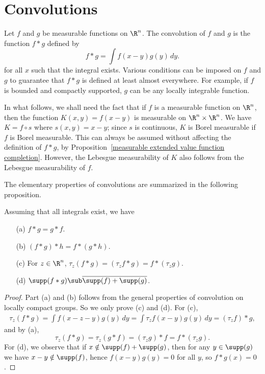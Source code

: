 \section{Convolutions}
Let $f$ and $g$ be measurable functions on $\R^n$. The convolution of $f$ and $g$ is the function $f\ast g$ defined by
\[f\ast g=\int f(x-y)g(y)\,dy.\]
for all $x$ such that the integral exists. Various conditions can be imposed on $f$ and $g$ to guarantee that $f\ast g$ is defined at least almost everywhere. For example, if $f$ is bounded and compactly supported, $g$ can be any locally integrable function.\par
In what follows, we shall need the fact that if $f$ is a measurable function on $\R^n$, then the function $K(x,y)=f(x-y)$ is measurable on $\R^n\times\R^n$. We have $K=f\circ s$ where $s(x,y)=x-y$; since $s$ is continuous, $K$ is Borel measurable if $f$ is Borel measurable. This can always be assumed without affecting the definition of $f\ast g$, by Proposition~\ref{measurable extended value function completion}. However, the Lebesgue measurability of $K$ also follows from the Lebesgue measurability of $f$.\par
The elementary properties of convolutions are summarized in the following proposition.
\begin{proposition}\label{convolution on R^n prop}
Assuming that all integrals exist, we have
\begin{itemize}
\item[(a)] $f\ast g=g\ast f$.
\item[(b)] $(f\ast g)\ast h=f\ast(g\ast h)$.
\item[(c)] For $z\in\R^n$, $\tau_z(f\ast g)=(\tau_zf\ast g)=f\ast(\tau_zg)$.
\item[(d)] $\supp(f\ast g)\sub\overline{\supp(f)+\supp(g)}$.
\end{itemize}
\end{proposition}
\begin{proof}
Part (a) and (b) follows from the general properties of convolution on locally compact groups. So we only prove (c) and (d). For (c),
\begin{align*}
\tau_z(f\ast g)=\int f(x-z-y)g(y)\,dy=\int\tau_{z}f(x-y)g(y)\,dy=(\tau_zf)\ast g,
\end{align*}
and by (a),
\[\tau_z(f\ast g)=\tau_z(g\ast f)=(\tau_zg)\ast f=f\ast(\tau_zg).\]
For (d), we observe that if $x\notin\supp(f)+\supp(g)$, then for any $y\in\supp(g)$ we have $x-y\notin\supp(f)$, hence $f(x-y)g(y)=0$ for all $y$, so $f\ast g(x)=0$.
\end{proof}
